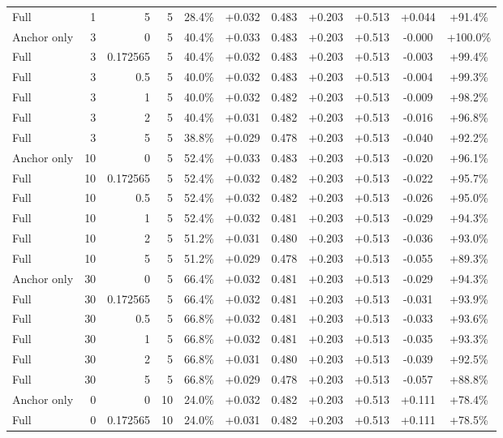 \begin{table}[htbp]
\begin{tabular}{lrrrccccccc}
Full & 1 & 5 & 5 & 28.4\% & +0.032 & 0.483 & +0.203 & +0.513 & +0.044 & +91.4\% \\
Anchor only & 3 & 0 & 5 & 40.4\% & +0.033 & 0.483 & +0.203 & +0.513 & -0.000 & +100.0\% \\
Full & 3 & 0.172565 & 5 & 40.4\% & +0.032 & 0.483 & +0.203 & +0.513 & -0.003 & +99.4\% \\
Full & 3 & 0.5 & 5 & 40.0\% & +0.032 & 0.483 & +0.203 & +0.513 & -0.004 & +99.3\% \\
Full & 3 & 1 & 5 & 40.0\% & +0.032 & 0.482 & +0.203 & +0.513 & -0.009 & +98.2\% \\
Full & 3 & 2 & 5 & 40.4\% & +0.031 & 0.482 & +0.203 & +0.513 & -0.016 & +96.8\% \\
Full & 3 & 5 & 5 & 38.8\% & +0.029 & 0.478 & +0.203 & +0.513 & -0.040 & +92.2\% \\
Anchor only & 10 & 0 & 5 & 52.4\% & +0.033 & 0.483 & +0.203 & +0.513 & -0.020 & +96.1\% \\
Full & 10 & 0.172565 & 5 & 52.4\% & +0.032 & 0.482 & +0.203 & +0.513 & -0.022 & +95.7\% \\
Full & 10 & 0.5 & 5 & 52.4\% & +0.032 & 0.482 & +0.203 & +0.513 & -0.026 & +95.0\% \\
Full & 10 & 1 & 5 & 52.4\% & +0.032 & 0.481 & +0.203 & +0.513 & -0.029 & +94.3\% \\
Full & 10 & 2 & 5 & 51.2\% & +0.031 & 0.480 & +0.203 & +0.513 & -0.036 & +93.0\% \\
Full & 10 & 5 & 5 & 51.2\% & +0.029 & 0.478 & +0.203 & +0.513 & -0.055 & +89.3\% \\
Anchor only & 30 & 0 & 5 & 66.4\% & +0.032 & 0.481 & +0.203 & +0.513 & -0.029 & +94.3\% \\
Full & 30 & 0.172565 & 5 & 66.4\% & +0.032 & 0.481 & +0.203 & +0.513 & -0.031 & +93.9\% \\
Full & 30 & 0.5 & 5 & 66.8\% & +0.032 & 0.481 & +0.203 & +0.513 & -0.033 & +93.6\% \\
Full & 30 & 1 & 5 & 66.8\% & +0.032 & 0.481 & +0.203 & +0.513 & -0.035 & +93.3\% \\
Full & 30 & 2 & 5 & 66.8\% & +0.031 & 0.480 & +0.203 & +0.513 & -0.039 & +92.5\% \\
Full & 30 & 5 & 5 & 66.8\% & +0.029 & 0.478 & +0.203 & +0.513 & -0.057 & +88.8\% \\
Anchor only & 0 & 0 & 10 & 24.0\% & +0.032 & 0.482 & +0.203 & +0.513 & +0.111 & +78.4\% \\
Full & 0 & 0.172565 & 10 & 24.0\% & +0.031 & 0.482 & +0.203 & +0.513 & +0.111 & +78.5\% \\

\end{tabular}
\end{table}
